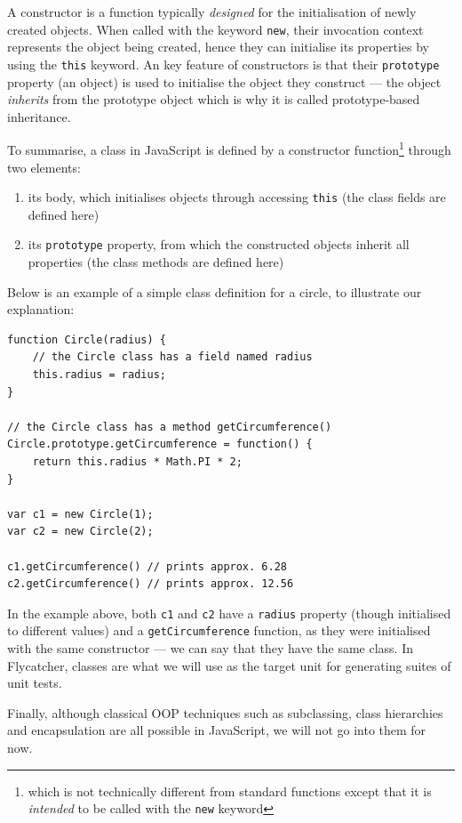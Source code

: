\documentclass[a4paper,11pt,titlepage]{report}
\begin{document}
A constructor is a function typically \emph{designed} for the initialisation of newly created objects. When called with the keyword \texttt{new}, their invocation context represents the object being created, hence they can initialise its properties by using the \texttt{this} keyword. An key feature of constructors is that their \texttt{prototype} property (an object) is used to initialise the object they construct --- the object \emph{inherits} from the prototype object which is why it is called prototype-based inheritance.

To summarise, a class in JavaScript is defined by a constructor function\footnote{which is not technically different from standard functions except that it is \emph{intended} to be called with the \texttt{new} keyword} through two elements:

\begin{enumerate}
   \item its body, which initialises objects through accessing \texttt{this} (the class fields are defined here)
   \item its \texttt{prototype} property, from which the constructed objects inherit all properties (the class methods are defined here)
\end{enumerate}

Below is an example of a simple class definition for a circle, to illustrate our explanation:

\begin{verbatim}
function Circle(radius) {
    // the Circle class has a field named radius
    this.radius = radius;
}

// the Circle class has a method getCircumference()
Circle.prototype.getCircumference = function() {
    return this.radius * Math.PI * 2;
}

var c1 = new Circle(1);
var c2 = new Circle(2);

c1.getCircumference() // prints approx. 6.28
c2.getCircumference() // prints approx. 12.56

\end{verbatim}

In the example above, both \texttt{c1} and \texttt{c2} have a \texttt{radius} property (though initialised to different values) and a \texttt{getCircumference} function, as they were initialised with the same constructor --- we can say that they have the same class. In \textsf{Flycatcher}, classes are what we will use as the target unit for generating suites of unit tests.

Finally, although classical OOP techniques such as subclassing, class hierarchies and encapsulation are all possible in JavaScript, we will not go into them for now.
\end{document}
